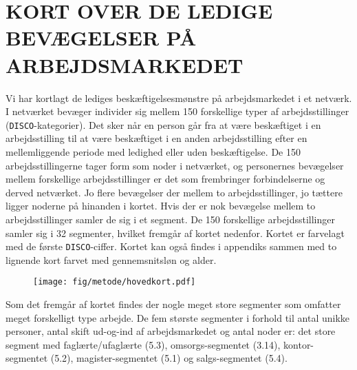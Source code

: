 






\chapter{KORT OVER DE LEDIGE BEVÆGELSER PÅ ARBEJDSMARKEDET \label{hovedkort}}

Vi har kortlagt de lediges beskæftigelsesmønstre på arbejdsmarkedet i et netværk. I netværket bevæger individer sig mellem 150 forskellige typer af arbejdsstillinger (\texttt{DISCO}-kategorier). Det sker når en person går fra at være beskæftiget i en arbejdsstilling til at være beskæftiget i en anden arbejdsstilling efter en mellemliggende periode med ledighed eller uden beskæftigelse. De 150 arbejdsstillingerne tager form som noder i netværket, og personernes bevægelser mellem forskellige arbejdsstillinger er det som frembringer forbindelserne og derved netværket. Jo flere bevægelser der mellem to arbejdsstillinger, jo tættere ligger noderne på hinanden i kortet. Hvis der er nok bevægelse mellem to arbejdsstillinger samler de sig i et segment. De 150 forskellige arbejdsstillinger samler sig i 32 segmenter, hvilket fremgår af kortet nedenfor. Kortet er farvelagt med de første \texttt{DISCO}-ciffer. Kortet kan også findes i appendiks sammen med to lignende kort farvet med gennemsnitsløn og alder. 
% 
\begin{figure}[H]
\begin{centering}
	\texttt{[image: fig/metode/hovedkort.pdf]}
	\label{fig_hovedkort_disco}
\end{centering}
\end{figure}
% 
Som det fremgår af kortet findes der nogle meget store segmenter som omfatter meget forskelligt type arbejde. De fem største segmenter i forhold til antal unikke personer, antal skift ud-og-ind af arbejdsmarkedet og antal noder er: det store segment med faglærte/ufaglærte (5.3), omsorgs-segmentet (3.14), kontor-segmentet (5.2), magister-segmentet (5.1) og salgs-segmentet (5.4).

